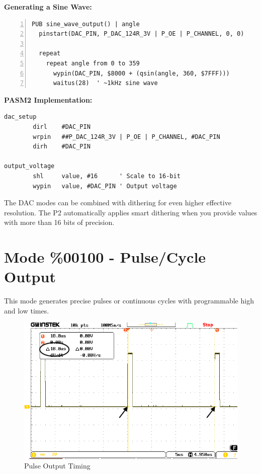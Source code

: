 \documentclass[11pt,a4paper,oneside,english]{book}
\begin{document}
\textbf{Generating a Sine Wave:}

\begin{Spin2Block}
\begin{Verbatim}[numbers=left,numbersep=5pt,xleftmargin=15pt]
PUB sine_wave_output() | angle
  pinstart(DAC_PIN, P_DAC_124R_3V | P_OE | P_CHANNEL, 0, 0)
  
  repeat
    repeat angle from 0 to 359
      wypin(DAC_PIN, $8000 + (qsin(angle, 360, $7FFF)))
      waitus(28)  ' ~1kHz sine wave
\end{Verbatim}
\end{Spin2Block}

\textbf{PASM2 Implementation:}

\begin{PASM2Block}
\begin{lstlisting}
dac_setup
        dirl    #DAC_PIN
        wrpin   ##P_DAC_124R_3V | P_OE | P_CHANNEL, #DAC_PIN
        dirh    #DAC_PIN
        
output_voltage
        shl     value, #16      ' Scale to 16-bit
        wypin   value, #DAC_PIN ' Output voltage
\end{lstlisting}
\end{PASM2Block}

The DAC modes can be combined with dithering for even higher effective
resolution. The P2 automatically applies smart dithering when you
provide values with more than 16 bits of precision.

\clearpage

\hypertarget{mode-00100---pulsecycle-output}{%
\section{Mode \%00100 - Pulse/Cycle
Output}\label{mode-00100---pulsecycle-output}}

This mode generates precise pulses or continuous cycles with
programmable high and low times.

\begin{figure}
\centering
\includegraphics{assets/P2 SmartPins-220809_page19_img01.png}
\caption{Pulse Output Timing}
\end{figure}
\end{document}
